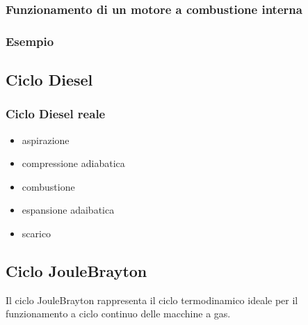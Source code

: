\documentclass[letterpaper,10pt,italian]{jupyterBook}
\begin{document}
\subsubsection{Funzionamento di un motore a combustione interna}
\label{\detokenize{ch/thermodynamics/heat-engine-otto:funzionamento-di-un-motore-a-combustione-interna}}
\sphinxAtStartPar
{}


\subsubsection{Esempio}
\label{\detokenize{ch/thermodynamics/heat-engine-otto:esempio}}
\sphinxAtStartPar
{}

\sphinxstepscope


\subsection{Ciclo Diesel}
\label{\detokenize{ch/thermodynamics/heat-engine-diesel:ciclo-diesel}}\label{\detokenize{ch/thermodynamics/heat-engine-diesel:physics-hs-thermodynamics-heat-engine-diesel}}\label{\detokenize{ch/thermodynamics/heat-engine-diesel::doc}}

\subsubsection{Ciclo Diesel reale}
\label{\detokenize{ch/thermodynamics/heat-engine-diesel:ciclo-diesel-reale}}\begin{itemize}
\item {} 
\sphinxAtStartPar
aspirazione

\item {} 
\sphinxAtStartPar
compressione adiabatica

\item {} 
\sphinxAtStartPar
combustione

\item {} 
\sphinxAtStartPar
espansione adaibatica

\item {} 
\sphinxAtStartPar
scarico

\end{itemize}

\sphinxstepscope


\subsection{Ciclo Joule\sphinxhyphen{}Brayton}
\label{\detokenize{ch/thermodynamics/heat-engine-joule-brayton:ciclo-joule-brayton}}\label{\detokenize{ch/thermodynamics/heat-engine-joule-brayton:physics-hs-thermodynamics-heat-engine-joule-brayton}}\label{\detokenize{ch/thermodynamics/heat-engine-joule-brayton::doc}}
\sphinxAtStartPar
{}
Il ciclo Joule\sphinxhyphen{}Brayton rappresenta il ciclo termodinamico ideale per il funzionamento a ciclo continuo delle macchine a gas.
\end{document}
